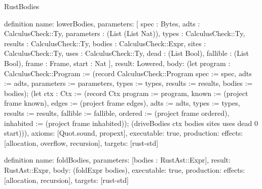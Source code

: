 \begin{lexlean}{RustBodies}
\begin{semanticmodule}
definition{
  name: lowerBodies,
  parameters: [
    spec : Bytes,
    adts : CalculusCheck::Ty,
    parameters : (List (List Nat)),
    types : CalculusCheck::Ty,
    results : CalculusCheck::Ty,
    bodies : CalculusCheck::Expr,
    sites : CalculusCheck::Ty,
    uses : CalculusCheck::Ty,
    dead : (List Bool),
    fallible : (List Bool),
    frame : Frame,
    start : Nat
  ],
  result: Lowered,
  body: (let program : CalculusCheck::Program := (record CalculusCheck::Program {spec := spec, adts := adts, parameters := parameters, types := types, results := results, bodies := bodies}); (let ctx : Ctx := (record Ctx {program := program, known := (project frame known), edges := (project frame edges), adts := adts, types := types, results := results, fallible := fallible, ordered := (project frame ordered), inhabited := (project frame inhabited)}); (driveBodies ctx bodies sites uses dead 0 start))),
  axioms: [Quot.sound, propext],
  executable: true,
  production: {effects: [allocation, overflow, recursion], targets: [rust-std]}
}

definition{
  name: foldBodies,
  parameters: [bodies : RustAst::Expr],
  result: RustAst::Expr,
  body: (foldExpr bodies),
  executable: true,
  production: {effects: [allocation, recursion], targets: [rust-std]}
}
\end{semanticmodule}
\end{lexlean}
